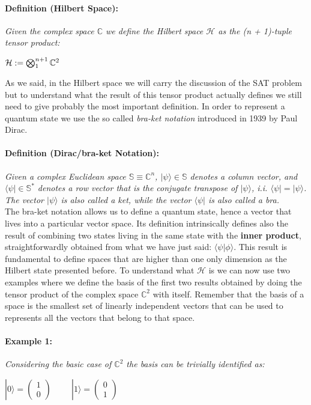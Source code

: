 \documentclass[english]{article}
\newcommand{\sbigotimes}{%
	\mathop{\mathchoice{\textstyle\bigotimes}{\bigotimes}{\bigotimes}{\bigotimes}}%
}
\newcommand{\zeroket}{\begin{pmatrix} 1 \\ 0 \end{pmatrix}}
\begin{document}
			\paragraph{Definition (Hilbert Space):} \emph{Given the complex space $\mathbb{C}$ we define the Hilbert space $\mathcal{H}$ as the (n + 1)-tuple tensor product:}
			\begin{center}
				$
				\mathcal{H} := \sbigotimes_1^{n+1} \mathbb{C}^{2}
				$
			\end{center}
		
			As we said, in the Hilbert space we will carry the discussion of the SAT problem but to understand what the result of this tensor product actually defines we still need to give probably the most important definition. In order to represent a quantum state we use the so called \emph{bra-ket notation} introduced in 1939 by Paul Dirac.
			
			\paragraph{Definition (Dirac/bra-ket Notation):} \emph{Given a complex Euclidean space $\mathbb{S} \equiv \mathbb{C}^{n}$, $|\psi\rangle \in \mathbb{S}$ denotes a column vector, and $\langle\psi| \in \mathbb{S}^{*}$ denotes a row vector that is the conjugate transpose of $|\psi\rangle$, i.i. $\langle\psi| = |\psi\rangle$. The vector $|\psi\rangle$ is also called a ket, while the vector $\langle\psi|$ is also called a bra.} \\
			
			The bra-ket notation allows us to define a quantum state, hence a vector that lives into a particular vector space. Its definition intrinsically defines also the result of combining two states living in the same state with the \textbf{inner product}, straightforwardly obtained from what we have just said: $\langle\psi|\phi\rangle$. This result is fundamental to define spaces that are higher than one only dimension as the Hilbert state presented before. To understand what $\mathcal{H}$ is we can now use two examples where we define the basis of the first two results obtained by doing the tensor product of the complex space $\mathbb{C}^{2}$ with itself. Remember that the basis of a space is the smallest set of linearly independent vectors that can be used to represents all the vectors that belong to that space.
			
			\paragraph{Example 1:} \emph{Considering the basic case of $\mathbb{C}^{2}$ the basis can be trivially identified as:}
			\begin{center}
				$|0\rangle = \zeroket \hspace{1cm} |1\rangle = \begin{pmatrix} 0 \\ 1 \end{pmatrix}$
			\end{center}
		
\end{document}
